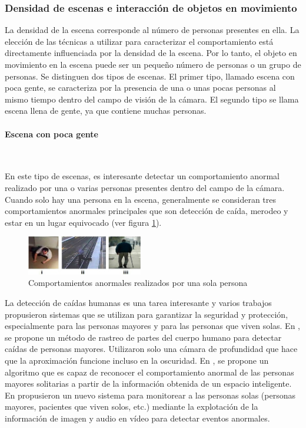 \subsubsection*{Densidad de escenas e interacción de objetos en movimiento}
\label{subsubsec:densidad-escenas-interacción-objetos-movimiento}

La densidad de la escena corresponde al número de personas presentes en ella. La elección de las técnicas a utilizar para caracterizar el comportamiento está directamente influenciada por la densidad de la escena. Por lo tanto, el objeto en movimiento en la escena puede ser un pequeño número de personas o un grupo de personas. Se distinguen dos tipos de escenas. El primer tipo, llamado escena con poca gente, se caracteriza por la presencia de una o unas pocas personas al mismo tiempo dentro del campo de visión de la cámara. El segundo tipo se llama escena llena de gente, ya que contiene muchas personas.

\paragraph*{Escena con poca gente}\mbox{} \\
\label{parag:escena-poca-gente}

En este tipo de escenas, es interesante detectar un comportamiento anormal realizado por una o varias personas presentes dentro del campo de la cámara. Cuando solo hay una persona en la escena, generalmente se consideran tres comportamientos anormales principales que son detección de caída, merodeo y estar en un lugar equivocado (ver figura \ref{fig:abnormal-behaviors-single-person}).

\begin{figure}[ht]
\centering
\includegraphics[width=0.45\textwidth]{img/chapters/estado-del-arte/Abnormal-behaviors-single-person.jpg}
\caption{\label{fig:abnormal-behaviors-single-person}Comportamientos anormales realizados por una sola persona \cite{BENMABROUK2018480}}
\end{figure}

La detección de caídas humanas es una tarea interesante y varios trabajos propusieron sistemas que se utilizan para garantizar la seguridad y protección, especialmente para las personas mayores y para las personas que viven solas. En \cite{6804646}, se propone un método de rastreo de partes del cuerpo humano para detectar caídas de personas mayores. Utilizaron solo una cámara de profundidad que hace que la aproximación funcione incluso en la oscuridad. En \cite{HUANG2014125}, se propone un algoritmo que es capaz de reconocer el comportamiento anormal de las personas mayores solitarias a partir de la información obtenida de un espacio inteligente. En \cite{6916753} propusieron un nuevo sistema para monitorear a las personas solas (personas mayores, pacientes que viven solos, etc.) mediante la explotación de la información de imagen y audio en vídeo para detectar eventos anormales.

